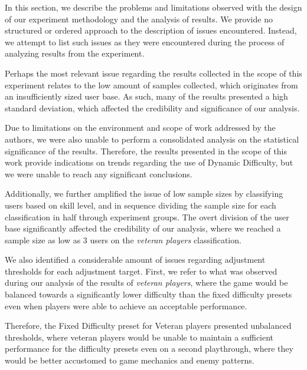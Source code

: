In this section, we describe the problems and limitations observed with the design of our experiment methodology and the analysis of results. We provide no structured or ordered approach to the description of issues encountered. Instead, we attempt to list such issues as they were encountered during the process of analyzing results from the experiment.

Perhaps the most relevant issue regarding the results collected in the scope of this experiment relates to the low amount of samples collected, which originates from an insufficiently sized user base. As such, many of the results presented a high standard deviation, which affected the credibility and significance of our analysis.

Due to limitations on the environment and scope of work addressed by the authors, we were also unable to perform a consolidated analysis on the statistical significance of the results. Therefore, the results presented in the scope of this work provide indications on trends regarding the use of Dynamic Difficulty, but we were unable to reach any significant conclusions.

Additionally, we further amplified the issue of low sample sizes by classifying users based on skill level, and in sequence dividing the sample size for each classification in half through experiment groups. The overt division of the user base significantly affected the credibility of our analysis, where we reached a sample size as low as 3 users on the \emph{veteran players} classification.

We also identified a considerable amount of issues regarding adjustment thresholds for each adjustment target. First, we refer to what was observed during our analysis of the results of \emph{veteran players}, where the game would be balanced towards a significantly lower difficulty than the fixed difficulty presets even when players were able to achieve an acceptable performance.

Therefore, the Fixed Difficulty preset for Veteran players presented unbalanced thresholds, where veteran players would be unable to maintain a sufficient performance for the difficulty presets even on a second playthrough, where they would be better accustomed to game mechanics and enemy patterns.


